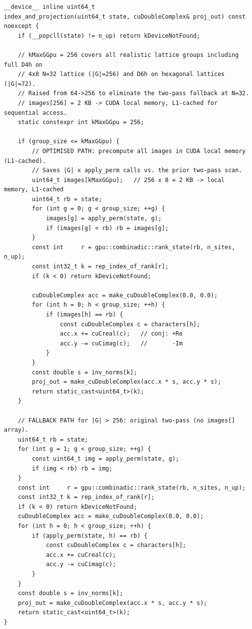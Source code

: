 \documentclass[11pt,a4paper]{article}
\begin{document}
\begin{lstlisting}[caption={GPU fused index\_and\_projection with optimized and fallback paths (device\_basis\_policy.cuh)}]
__device__ inline uint64_t
index_and_projection(uint64_t state, cuDoubleComplex& proj_out) const noexcept {
    if (__popcll(state) != n_up) return kDeviceNotFound;

    // kMaxGGpu = 256 covers all realistic lattice groups including full D4h on
    // 4x8 N=32 lattice (|G|=256) and D6h on hexagonal lattices (|G|=72).
    // Raised from 64->256 to eliminate the two-pass fallback at N=32.
    // images[256] = 2 KB -> CUDA local memory, L1-cached for sequential access.
    static constexpr int kMaxGGpu = 256;

    if (group_size <= kMaxGGpu) {
        // OPTIMISED PATH: precompute all images in CUDA local memory (L1-cached).
        // Saves |G| x apply_perm calls vs. the prior two-pass scan.
        uint64_t images[kMaxGGpu];   // 256 x 8 = 2 KB -> local memory, L1-cached
        uint64_t rb = state;
        for (int g = 0; g < group_size; ++g) {
            images[g] = apply_perm(state, g);
            if (images[g] < rb) rb = images[g];
        }
        const int     r = gpu::combinadic::rank_state(rb, n_sites, n_up);
        const int32_t k = rep_index_of_rank[r];
        if (k < 0) return kDeviceNotFound;

        cuDoubleComplex acc = make_cuDoubleComplex(0.0, 0.0);
        for (int h = 0; h < group_size; ++h) {
            if (images[h] == rb) {
                const cuDoubleComplex c = characters[h];
                acc.x += cuCreal(c);   // conj: +Re
                acc.y -= cuCimag(c);   //       -Im
            }
        }
        const double s = inv_norms[k];
        proj_out = make_cuDoubleComplex(acc.x * s, acc.y * s);
        return static_cast<uint64_t>(k);
    }

    // FALLBACK PATH for |G| > 256: original two-pass (no images[] array).
    uint64_t rb = state;
    for (int g = 1; g < group_size; ++g) {
        const uint64_t img = apply_perm(state, g);
        if (img < rb) rb = img;
    }
    const int     r = gpu::combinadic::rank_state(rb, n_sites, n_up);
    const int32_t k = rep_index_of_rank[r];
    if (k < 0) return kDeviceNotFound;
    cuDoubleComplex acc = make_cuDoubleComplex(0.0, 0.0);
    for (int h = 0; h < group_size; ++h) {
        if (apply_perm(state, h) == rb) {
            const cuDoubleComplex c = characters[h];
            acc.x += cuCreal(c);
            acc.y -= cuCimag(c);
        }
    }
    const double s = inv_norms[k];
    proj_out = make_cuDoubleComplex(acc.x * s, acc.y * s);
    return static_cast<uint64_t>(k);
}
\end{lstlisting}
\end{document}
